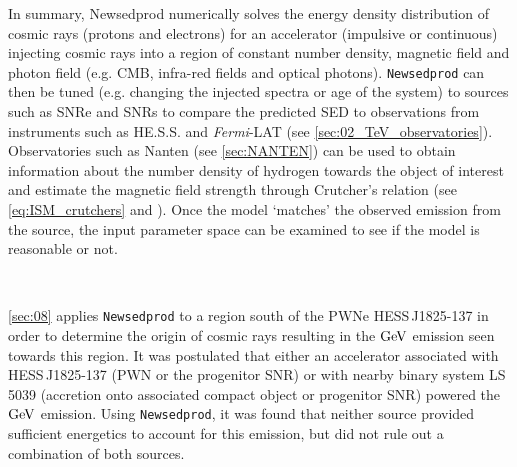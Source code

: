 In summary, {\tt} Newsedprod numerically solves the energy density distribution of cosmic rays (protons and electrons) for an accelerator (impulsive or continuous) injecting cosmic rays into a region of constant number density, magnetic field and photon field (e.g. CMB, infra-red fields and optical photons). {\tt Newsedprod} can then be tuned (e.g. changing the injected spectra or age of the system) to sources such as SNRe and SNRs to compare the predicted SED to observations from instruments such as HE.S.S. and \textit{Fermi}-LAT (see \autoref{sec:02_TeV_observatories}). Observatories such as Nanten (see \autoref{sec:NANTEN}) can be used to obtain information about the number density of hydrogen towards the object of interest and estimate the magnetic field strength through Crutcher's relation (see \autoref{eq:ISM_crutchers} and \cite{2010ApJ...725..466C}). Once the model `matches' the observed emission from the source, the input parameter space can be examined to see if the model is reasonable or not.
\par~\par
\autoref{sec:08} applies {\tt Newsedprod} to a region south of the PWNe \mbox{HESS\,J1825-137} in order to determine the origin of cosmic rays resulting in the $\si{\giga\electronvolt}$ emission seen towards this region. It was postulated that either an accelerator associated with \mbox{HESS\,J1825-137} (PWN or the progenitor SNR) or with nearby binary system \mbox{LS\,5039} (accretion onto associated compact object or progenitor SNR) powered the $\si{\giga\electronvolt}$ emission. Using {\tt Newsedprod}, it was found that neither source provided sufficient energetics to account for this emission, but did not rule out a combination of both sources.